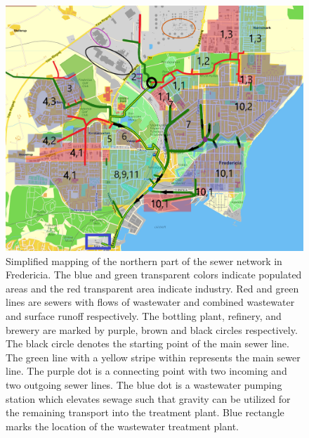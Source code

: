 \begin{figure}[H]
\centering
\includegraphics[width=1\textwidth]{report/system_overview/pictures/kloakgrid_simplified10.png}
\caption{Simplified mapping of the northern part of the sewer network in Fredericia. The blue and green transparent colors indicate populated areas and the red transparent area indicate industry. Red and green lines are sewers with flows of wastewater and combined wastewater and surface runoff respectively. The bottling plant, refinery, and brewery are marked by purple, brown and black circles respectively. The black circle denotes the starting point of the main sewer line. The green line with a yellow stripe within represents the main sewer line. The purple dot is a connecting point with two incoming and two outgoing sewer lines. The blue dot is a wastewater pumping station which elevates sewage such that gravity can be utilized for the remaining transport into the treatment plant. Blue rectangle marks the location of the wastewater treatment plant.
\cite{Krak} \cite{GIS_kort}}
\label{fig:kloakgrid_simplified}
\end{figure}


